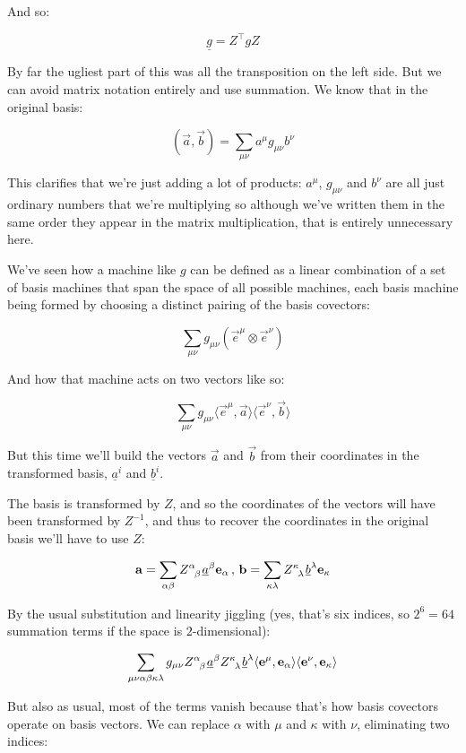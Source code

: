 And so:

$$
\underline{g} = Z^\intercal g Z
$$

By far the ugliest part of this was all the transposition on the left side. But we can avoid matrix notation entirely and use summation. We know that in the original basis:

$$
(\vec{a}, \vec{b}) = \sum_{\mu\nu} a^{\mu} g_{\mu\nu} b^{\nu}
$$

This clarifies that we're just adding a lot of products: $a^{\mu}$, $g_{\mu\nu}$ and $b^{\nu}$ are all just ordinary numbers that we're multiplying so although we've written them in the same order they appear in the matrix multiplication, that is entirely unnecessary here.

We've seen how a machine like $g$ can be defined as a linear combination of a set of basis machines that span the space of all possible machines, each basis machine being formed by choosing a distinct pairing of the basis covectors:

$$
\sum_{\mu\nu} g_{\mu\nu} (\vec{e}^\mu \otimes \vec{e}^\nu)
$$

And how that machine acts on two vectors like so:

$$
\sum_{\mu\nu} g_{\mu\nu} \langle \vec{e}^\mu,\vec{a} \rangle \langle \vec{e}^\nu,\vec{b} \rangle
$$

But this time we'll build the vectors $\vec{a}$ and $\vec{b}$ from their coordinates in the transformed basis, $\underline{a}^{i}$ and $\underline{b}^{i}$.

The basis is transformed by $Z$, and so the coordinates of the vectors will have been transformed by $Z^{-1}$, and thus to recover the coordinates in the original basis we'll have to use $Z$:

$$
\vec{a} = \sum_{\alpha\beta} Z\indices{^\alpha_\beta} \underline{a}^{\beta} \vec{e}_{\alpha}
\, , \,
\vec{b} = \sum_{\kappa\lambda} Z\indices{^\kappa_\lambda} \underline{b}^{\lambda} \vec{e}_{\kappa}
$$

By the usual substitution and linearity jiggling (yes, that's six indices, so $2^6 = 64$ summation terms if the space is $2$-dimensional):

$$
\sum_{\mu\nu\alpha\beta\kappa\lambda} g_{\mu\nu} Z\indices{^\alpha_\beta} \underline{a}^{\beta} Z\indices{^\kappa_\lambda} \underline{b}^{\lambda} \langle \vec{e}^\mu, \vec{e}_\alpha \rangle \langle \vec{e}^\nu, \vec{e}_\kappa \rangle
$$

But also as usual, most of the terms vanish because that's how basis covectors operate on basis vectors. We can replace $\alpha$ with $\mu$ and $\kappa$ with $\nu$, eliminating two indices:

